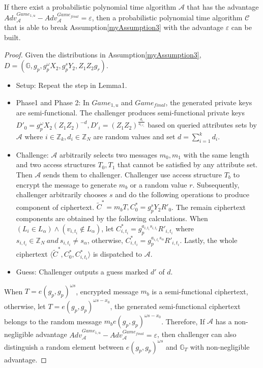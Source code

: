 \documentclass[smallextended]{svjour3}       %
\begin{document}
\begin{myLemma}
	If there exist a probabilistic polynomial time algorithm $\mathcal{A}$ that has the advantage $Adv_{\mathcal{A}}^{Game_{1,u}}-Adv_{\mathcal{A}}^{Game_{final}}=\varepsilon$, then a probabilistic polynomial time algorithm $\mathcal{C}$ that is able to break Assumption\ref{myAssumption3} with the advantage $\varepsilon$ can be built.
\end{myLemma}
\begin{proof}
	Given the distributions in Assumption\ref{myAssumption3}, $D=(\mathbb{G},g_p,g_p^{\omega}X_2,g_p^{s}Y_2,Z_1Z_2g_r)$.
	\begin{itemize}
		\item Setup: Repeat the step in Lemma1.
		\item Phase1 and Phase 2: In $Game_{1,u}$ and $Game_{final}$, the generated private keys are semi-functional. The challenger produces semi-functional private keys $D'_0=g_p^{\omega}X_2(Z_1Z_2)^{-d},D'_i=(Z_1Z_2)^{\frac{d_i}{a_{i,t_i}}}$ based on queried attributes sets by $\mathcal{A}$ where $i \in \mathbb{Z}_k, d_i \in \mathbb{Z}_N$ are random values and set $d = \sum_{i=1}^{k}d_i$. 
		\item Challenge: $\mathcal{A}$ arbitrarily selects two messages $m_0,m_1$ with the same length and two access structures $T_0,T_1$ that cannot be satisfied by any attribute set. Then $\mathcal{A}$ sends them to challenger. Challenger use access structure $T_b$ to encrypt the message to generate $m_b$ or a random value $r$. Subsequently, challenger arbitrarily chooses $s$ and do the following operations to produce component of ciphertext. $\tilde{C}^*=m_bT, C_0^*=g_p^sY_2R'_0$. The remain ciphertext components are obtained by the following calculations. When $(L_i \in L_\alpha)\wedge(v_{i,t_i} \notin L_\alpha)$, let $C^*_{i,t_i}=g_p^{a_{i,t_i}s_{i,t_i}}R'_{i,t_i}$ where $s_{i,t_i} \in \mathbb{Z}_N \ and \  s_{i,t_i} \neq s_\alpha$, otherwise, $C^*_{i,t_i}=g_p^{a_{i,t_i}s_{\alpha}}R'_{i,t_i}$. Lastly, the whole ciphertext $\langle \tilde{C}^*,C_0^*,C^{*}_{i,t_i}\rangle$ is dispatched to $\mathcal{A}$.
		\item Guess: Challenger outputs a guess marked $d'$ of $d$.  
	\end{itemize}
	When $T=e(g_p,g_p)^{\omega s}$, encrypted message $m_b$ is a semi-functional ciphertext, otherwise, let $T=e(g_p,g_p)^{\omega s - x_0}$, the generated semi-functional ciphertext belongs to the random message $m_be(g_p,g_p)^{\omega s-x_0}$. Therefore, If $\mathcal{A}$ has a non-negligible advantage $Adv_{\mathcal{A}}^{Game_{1,u}} - Adv_{\mathcal{A}}^{Game_{final}}=\varepsilon$, then challenger can also distinguish a random element between $e(g_p,g_p)^{\omega s}$ and $\mathbb{G}_T$ with non-negligible advantage. 
\end{proof}
\end{document}
